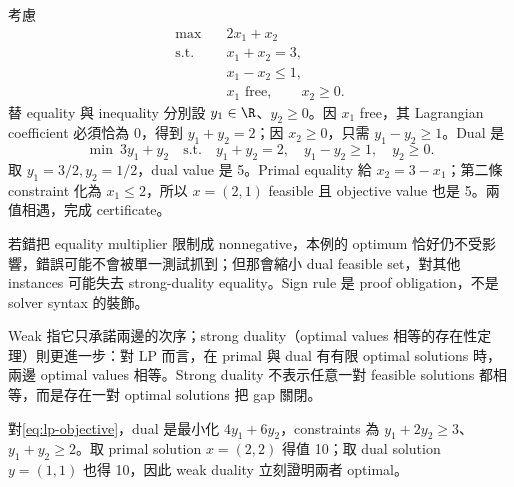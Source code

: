 \documentclass[11pt,a4paper,oneside,openany]{book}
\begin{document}
\begin{example}
考慮
\begin{align*}
\max\quad &2x_1+x_2\\
\text{s.t.}\quad
&x_1+x_2=3,\\
&x_1-x_2\le1,\\
&x_1\text{ free},\qquad x_2\ge0.
\end{align*}
替 equality 與 inequality 分別設 $y_1\in\R$、$y_2\ge0$。因 $x_1$ free，其 Lagrangian coefficient 必須恰為 0，得到 $y_1+y_2=2$；因 $x_2\ge0$，只需 $y_1-y_2\ge1$。Dual 是
\[
 \min\ 3y_1+y_2
 \quad\text{s.t.}\quad
 y_1+y_2=2,\quad y_1-y_2\ge1,\quad y_2\ge0.
\]
取 $y_1=3/2,y_2=1/2$，dual value 是 5。Primal equality 給 $x_2=3-x_1$；第二條 constraint 化為 $x_1\le2$，所以 $x=(2,1)$ feasible 且 objective value 也是 5。兩值相遇，完成 certificate。

若錯把 equality multiplier 限制成 nonnegative，本例的 optimum 恰好仍不受影響，錯誤可能不會被單一測試抓到；但那會縮小 dual feasible set，對其他 instances 可能失去 strong-duality equality。Sign rule 是 proof obligation，不是 solver syntax 的裝飾。
\end{example}

Weak 指它只承諾兩邊的次序；strong duality（optimal values 相等的存在性定理）則更進一步：對 LP 而言，在 primal 與 dual 有有限 optimal solutions 時，兩邊 optimal values 相等。Strong duality 不表示任意一對 feasible solutions 都相等，而是存在一對 optimal solutions 把 gap 關閉。

對\cref{eq:lp-objective}，dual 是最小化 $4y_1+6y_2$，constraints 為 $y_1+2y_2\ge3$、$y_1+y_2\ge2$。取 primal solution $x=(2,2)$ 得值 10；取 dual solution $y=(1,1)$ 也得 10，因此 weak duality 立刻證明兩者 optimal。
\end{document}
